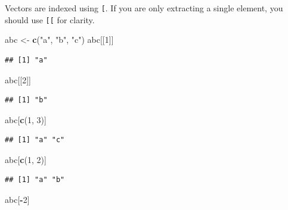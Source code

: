 \documentclass[openany]{book}
\newenvironment{Shaded}{\begin{snugshade}}{\end{snugshade}}
\newcommand{\DecValTok}[1]{\textcolor[rgb]{0.00,0.00,0.81}{#1}}
\newcommand{\KeywordTok}[1]{\textcolor[rgb]{0.13,0.29,0.53}{\textbf{#1}}}
\newcommand{\NormalTok}[1]{#1}
\newcommand{\OperatorTok}[1]{\textcolor[rgb]{0.81,0.36,0.00}{\textbf{#1}}}
\newcommand{\StringTok}[1]{\textcolor[rgb]{0.31,0.60,0.02}{#1}}
\begin{document}
Vectors are indexed using \texttt{{[}}. If you are only extracting a single element, you
should use \texttt{{[}{[}} for clarity.

\begin{Shaded}
\begin{Highlighting}[]
\NormalTok{abc <-}\StringTok{ }\KeywordTok{c}\NormalTok{(}\StringTok{"a"}\NormalTok{, }\StringTok{"b"}\NormalTok{, }\StringTok{"c"}\NormalTok{)}
\NormalTok{abc[[}\DecValTok{1}\NormalTok{]]}
\end{Highlighting}
\end{Shaded}

\begin{verbatim}
## [1] "a"
\end{verbatim}

\begin{Shaded}
\begin{Highlighting}[]
\NormalTok{abc[[}\DecValTok{2}\NormalTok{]]}
\end{Highlighting}
\end{Shaded}

\begin{verbatim}
## [1] "b"
\end{verbatim}

\begin{Shaded}
\begin{Highlighting}[]
\NormalTok{abc[}\KeywordTok{c}\NormalTok{(}\DecValTok{1}\NormalTok{, }\DecValTok{3}\NormalTok{)]}
\end{Highlighting}
\end{Shaded}

\begin{verbatim}
## [1] "a" "c"
\end{verbatim}

\begin{Shaded}
\begin{Highlighting}[]
\NormalTok{abc[}\KeywordTok{c}\NormalTok{(}\DecValTok{1}\NormalTok{, }\DecValTok{2}\NormalTok{)]}
\end{Highlighting}
\end{Shaded}

\begin{verbatim}
## [1] "a" "b"
\end{verbatim}

\begin{Shaded}
\begin{Highlighting}[]
\NormalTok{abc[}\OperatorTok{-}\DecValTok{2}\NormalTok{]}
\end{Highlighting}
\end{Shaded}
\end{document}
